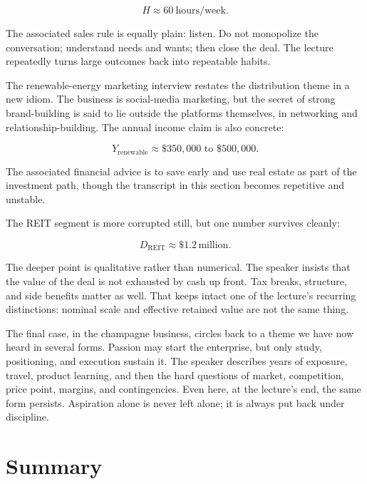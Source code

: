 \begin{equation}
H \approx 60\ \text{hours/week}.
\end{equation}

The associated sales rule is equally plain: listen. Do not monopolize the conversation; understand needs and wants; then close the deal. The lecture repeatedly turns large outcomes back into repeatable habits.

The renewable-energy marketing interview restates the distribution theme in a new idiom. The business is social-media marketing, but the secret of strong brand-building is said to lie outside the platforms themselves, in networking and relationship-building. The annual income claim is also concrete:

\begin{equation}
Y_{\mathrm{renewable}} \approx \$350{,}000 \text{ to } \$500{,}000.
\end{equation}

The associated financial advice is to save early and use real estate as part of the investment path, though the transcript in this section becomes repetitive and unstable.

The REIT segment is more corrupted still, but one number survives cleanly:

\begin{equation}
D_{\mathrm{REIT}} \approx \$1.2\,\text{million}.
\end{equation}

The deeper point is qualitative rather than numerical. The speaker insists that the value of the deal is not exhausted by cash up front. Tax breaks, structure, and side benefits matter as well. That keeps intact one of the lecture's recurring distinctions: nominal scale and effective retained value are not the same thing.

The final case, in the champagne business, circles back to a theme we have now heard in several forms. Passion may start the enterprise, but only study, positioning, and execution sustain it. The speaker describes years of exposure, travel, product learning, and then the hard questions of market, competition, price point, margins, and contingencies. Even here, at the lecture's end, the same form persists. Aspiration alone is never left alone; it is always put back under discipline.

\section{Summary}

